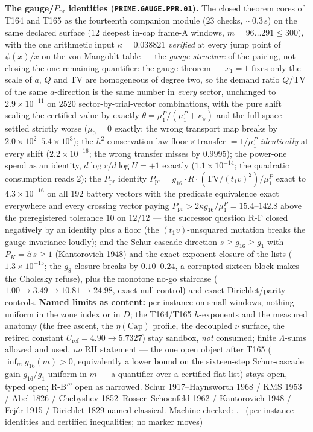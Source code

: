 \documentclass[11pt,a4paper]{article}
\theoremstyle{definition}
\begin{document}
\par\smallskip\noindent\textbf{The gauge/$P_{\mathrm{pr}}$ identities
(\texttt{PRIME.GAUGE.PPR.01}).}
The closed theorem cores of T164 and T165 as the fourteenth companion
module ($23$ checks, ${\sim}0.3$\,s) on the same declared surface ($12$
deepest in-cap frame-A windows, $m=96\ldots291\le300$), with the one
arithmetic input $\kappa=0.038821$ \emph{verified} at every jump point
of $\psi(x)/x$ on the von-Mangoldt table --- the \emph{gauge structure}
of the pairing, not closing the one remaining quantifier: the gauge
theorem --- $x_1=1$ fixes only the scale of $a$, $Q$ and TV are
homogeneous of degree two, so the demand ratio $Q/\mathrm{TV}$ of the
same $a$-direction is the same number in \emph{every} sector, unchanged
to $2.9\times10^{-11}$ on $2520$ sector-by-trial-vector combinations,
with the pure shift scaling the certified value by exactly
$\theta=\mu^P_1/(\mu^P_1+\kappa_s)$ and the full space settled strictly
worse ($\mu_0=0$ exactly; the wrong transport map breaks by
$2.0\times10^{2}$--$5.4\times10^{3}$); the $h^2$ conservation law
floor${}\times{}$transfer $=1/\mu^P_1$ \emph{identically} at every shift
($2.2\times10^{-16}$; the wrong transfer misses by $0.9995$); the
power-one spend as an identity, $d\log r/d\log U=+1$ exactly
($1.1\times10^{-14}$; the quadratic consumption reads $2$); the
$P_{\mathrm{pr}}$ identity
$P_{\mathrm{pr}}=g_{16}\cdot R\cdot(\mathrm{TV}/(t_1v)^2)/\mu^P_1$ exact
to $4.3\times10^{-16}$ on all $192$ battery vectors with the predicate
equivalence exact everywhere and every crossing vector paying
$P_{\mathrm{pr}}>2\kappa g_{16}/\mu^P_1=15.4$--$142.8$ above the
preregistered tolerance $10$ on $12/12$ --- the successor question R-F
closed negatively by an identity plus a floor (the $(t_1v)$-unsquared
mutation breaks the gauge invariance loudly); and the Schur-cascade
direction $s\ge g_{16}\ge g_1$ with $P_K=\hat a\,s\ge1$ (Kantorovich
1948) and the exact exponent closure of the lists
($1.3\times10^{-15}$; the $g_8$ closure breaks by $0.10$--$0.24$, a
corrupted sixteen-block makes the Cholesky refuse), plus the monotone
no-go staircase ($1.00\to3.49\to10.81\to24.98$, exact null control) and
exact Dirichlet/parity controls.
\textbf{Named limits as content:} per instance on small windows,
nothing uniform in the zone index or in $D$; the T164/T165
$h$-exponents and the measured anatomy (the free ascent, the
$\eta(\mathrm{Cap})$ profile, the decoupled $\nu$ surface, the retired
constant $U_{\mathrm{ref}}=4.90\to5.7327$) stay sandbox, \emph{not}
consumed; finite $\Lambda$-sums allowed and used, \emph{no} RH
statement --- the one open object after T165 ($\inf_m g_{16}(m)>0$,
equivalently a lower bound on the sixteen-step Schur-cascade gain
$g_{16}/g_1$ uniform in $m$ --- a quantifier over a certified flat
list) stays open, typed open; R-B$'''$ open as narrowed.
Schur 1917--Haynsworth 1968 / KMS 1953 / Abel 1826 / Chebyshev
1852--Rosser--Schoenfeld 1962 / Kantorovich 1948 / Fej\'er 1915 /
Dirichlet 1829 named classical. Machine-checked:
.
\mE\ (per-instance identities and certified inequalities; no marker moves)
\par\smallskip
\end{document}

